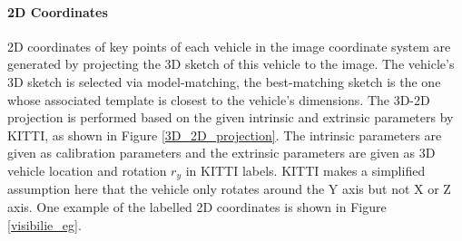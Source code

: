 \documentclass[a4paper,12pt]{article}
\begin{document}
\renewcommand{\arraystretch}{1.2}
\begin{table}[h]
	\centering
	\caption{Specification of three additional labels}
	\label{new_label}
\end{table}


\paragraph{2D Coordinates}

2D coordinates of key points of each vehicle in the image coordinate system are generated by projecting the 3D sketch of this vehicle to the image. The vehicle's 3D sketch is selected via model-matching, \ie the best-matching sketch is the one whose associated template is closest to the vehicle's dimensions. The 3D-2D projection is performed based on the given intrinsic and extrinsic parameters by KITTI, as shown in Figure \ref{3D_2D_projection}. The intrinsic parameters are given as calibration parameters and the extrinsic parameters are given as 3D vehicle location and rotation $r_y$ in KITTI labels. KITTI makes a simplified assumption here that the vehicle only rotates around the Y axis but not X or Z axis. One example of the labelled 2D coordinates is shown in Figure \ref{visibilie_eg}.
\end{document}
